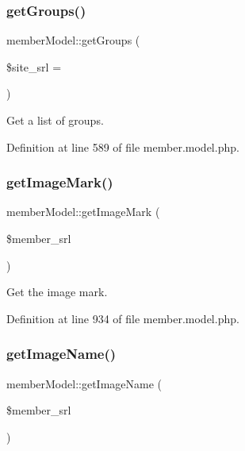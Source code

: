 \subsubsection{\texorpdfstring{get\+Groups()}{getGroups()}}
{\footnotesize\ttfamily member\+Model\+::get\+Groups (\begin{DoxyParamCaption}\item[{}]{\$site\+\_\+srl = {} }\end{DoxyParamCaption})}



Get a list of groups. 



Definition at line 589 of file member.\+model.\+php.

\mbox{\label{classmemberModel_a3c40e02685bba4add5cfbe95c7fae372}} 
\subsubsection{\texorpdfstring{get\+Image\+Mark()}{getImageMark()}}
{\footnotesize\ttfamily member\+Model\+::get\+Image\+Mark (\begin{DoxyParamCaption}\item[{}]{\$member\+\_\+srl }\end{DoxyParamCaption})}



Get the image mark. 



Definition at line 934 of file member.\+model.\+php.

\mbox{\label{classmemberModel_a127758d897360c92484d27fcc6183254}} 
\subsubsection{\texorpdfstring{get\+Image\+Name()}{getImageName()}}
{\footnotesize\ttfamily member\+Model\+::get\+Image\+Name (\begin{DoxyParamCaption}\item[{}]{\$member\+\_\+srl }\end{DoxyParamCaption})}



